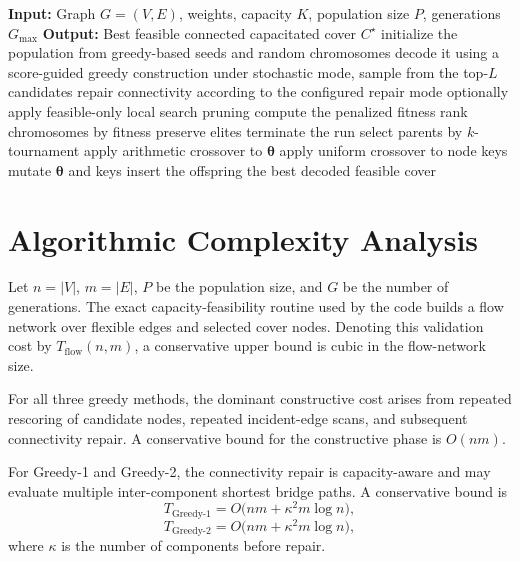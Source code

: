 \documentclass[11pt]{article}
\begin{document}
\begin{algorithm}[h]
\caption{HGA-2 / HGA-CCVC v2}
\begin{algorithmic}[1]
\State \textbf{Input:} Graph \(G=(V,E)\), weights, capacity \(K\), population size \(P\), generations \(G_{\max}\)
\State \textbf{Output:} Best feasible connected capacitated cover \(C^{\star}\)
\State initialize the population from greedy-based seeds and random chromosomes
        \State decode it using a score-guided greedy construction
        \State under stochastic mode, sample from the top-\(L\) candidates
        \State repair connectivity according to the configured repair mode
        \State optionally apply feasible-only local search pruning
        \State compute the penalized fitness
    \EndFor
    \State rank chromosomes by fitness
    \State preserve elites
        \State terminate the run
    \EndIf
        \State select parents by \(k\)-tournament
        \State apply arithmetic crossover to \(\boldsymbol{\theta}\)
        \State apply uniform crossover to node keys
        \State mutate \(\boldsymbol{\theta}\) and keys
        \State insert the offspring
    \EndWhile
\EndFor
\State \Return the best decoded feasible cover
\end{algorithmic}
\end{algorithm}

\section{Algorithmic Complexity Analysis}

Let \(n=|V|\), \(m=|E|\), \(P\) be the population size, and \(G\) be the number of generations. The exact capacity-feasibility routine used by the code builds a flow network over flexible edges and selected cover nodes. Denoting this validation cost by \(T_{\mathrm{flow}}(n,m)\), a conservative upper bound is cubic in the flow-network size.

For all three greedy methods, the dominant constructive cost arises from repeated rescoring of candidate nodes, repeated incident-edge scans, and subsequent connectivity repair. A conservative bound for the constructive phase is \(O(nm)\).

For Greedy-1 and Greedy-2, the connectivity repair is capacity-aware and may evaluate multiple inter-component shortest bridge paths. A conservative bound is
\[
T_{\text{Greedy-1}}=O\bigl(nm+\kappa^2m\log n\bigr),
\]
\[
T_{\text{Greedy-2}}=O\bigl(nm+\kappa^2m\log n\bigr),
\]
where \(\kappa\) is the number of components before repair.
\end{document}
